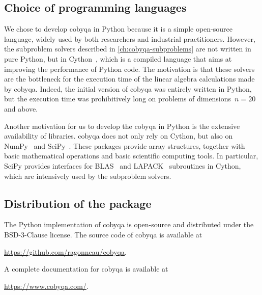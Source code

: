 \subsection{Choice of programming languages}

We chose to develop \gls{cobyqa} in Python because it is a simple open-source language, widely used by both researchers and industrial practitioners.
However, the subproblem solvers described in \cref{ch:cobyqa-subproblems} are not written in pure Python, but in Cython~\cite{Behnel_Etal_2011}, which is a compiled language that aims at improving the performance of Python code.
The motivation is that these solvers are the bottleneck for the execution time of the linear algebra calculations made by \gls{cobyqa}.
Indeed, the initial version of \gls{cobyqa} was entirely written in Python, but the execution time was prohibitively long on problems of dimensions~$n = 20$ and above.

Another motivation for us to develop the \gls{cobyqa} in Python is the extensive availability of libraries.
\Gls{cobyqa} does not only rely on Cython, but also on NumPy~\cite{Harris_Etal_2020} and SciPy~\cite{Virtanen_Etal_2020}.
These packages provide array structures, together with basic mathematical operations and basic scientific computing tools.
In particular, SciPy provides interfaces for BLAS~\cite{Blackford_Etal_2002} and LAPACK~\cite{Anderson_Etal_1999} subroutines in Cython, which are intensively used by the subproblem solvers.

\subsection{Distribution of the package}

The Python implementation of \gls{cobyqa} is open-source and distributed under the BSD-3-Clause license.
The source code of \gls{cobyqa} is available at
\begin{center}
    \url{https://github.com/ragonneau/cobyqa}.
\end{center}
A complete documentation for \gls{cobyqa} is available at
\begin{center}
    \url{https://www.cobyqa.com/}.
\end{center}

